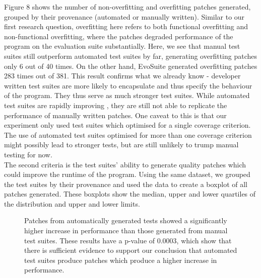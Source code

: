 \documentclass[titlepage]{article}
\begin{document}
Figure 8 shows the number of non-overfitting and overfitting patches generated, grouped by their provenance (automated or manually written). Similar to our first research question, overfitting here refers to both functional overfitting and non-functional overfitting, where the patches degraded performance of the program on the evaluation suite substantially. Here, we see that manual test suites still outperform automated test suites by far, generating overfitting patches only 6 out of 40 times. On the other hand, EvoSuite generated overfitting patches 283 times out of 381. This result confirms what we already know - developer written test suites are more likely to encapsulate and thus specify the behaviour of the program. They thus serve as much stronger test suites. While automated test suites are rapidly improving \cite{evosuitecompetition}, they are still not able to replicate the performance of manually written patches. One caveat to this is that our experiment only used test suites which optimised for a single coverage criterion. The use of automated test suites optimised for more than one coverage criterion might possibly lead to stronger tests, but are still unlikely to trump manual testing for now. \\

The second criteria is the test suites’ ability to generate quality patches which could improve the runtime of the program. Using the same dataset, we grouped the test suites by their provenance and used the data to create a boxplot of all patches generated. These boxplots show the median, upper and lower quartiles of the distribution and upper and lower limits.



\begin{figure}
    \begin{center}
        \resizebox{0.8\textwidth}{!}{}
    \end{center}
    \caption{Patches from automatically generated tests showed a significantly higher increase in performance than those generated from manual test suites. These results have a p-value of 0.0003, which show that there is sufficient evidence to support our conclusion that automated test suites produce patches which produce a higher increase in performance. }
\end{figure}
\end{document}
